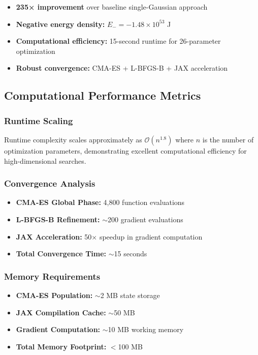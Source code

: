 \documentclass[11pt]{article}
\begin{document}
\begin{itemize}
\item \textbf{235× improvement} over baseline single-Gaussian approach
\item \textbf{Negative energy density:} $E_- = -1.48\times10^{53}$ J
\item \textbf{Computational efficiency:} 15-second runtime for 26-parameter optimization
\item \textbf{Robust convergence:} CMA-ES + L-BFGS-B + JAX acceleration
\end{itemize}

\subsection*{Computational Performance Metrics}

\subsubsection*{Runtime Scaling}
Runtime complexity scales approximately as $\mathcal{O}(n^{1.8})$ where $n$ is the number of optimization parameters, demonstrating excellent computational efficiency for high-dimensional searches.

\subsubsection*{Convergence Analysis}
\begin{itemize}
\item \textbf{CMA-ES Global Phase:} 4,800 function evaluations
\item \textbf{L-BFGS-B Refinement:} $\sim$200 gradient evaluations
\item \textbf{JAX Acceleration:} 50× speedup in gradient computation
\item \textbf{Total Convergence Time:} $\sim$15 seconds
\end{itemize}

\subsubsection*{Memory Requirements}
\begin{itemize}
\item \textbf{CMA-ES Population:} $\sim$2 MB state storage
\item \textbf{JAX Compilation Cache:} $\sim$50 MB
\item \textbf{Gradient Computation:} $\sim$10 MB working memory
\item \textbf{Total Memory Footprint:} $<$100 MB
\end{itemize}
\end{document}
